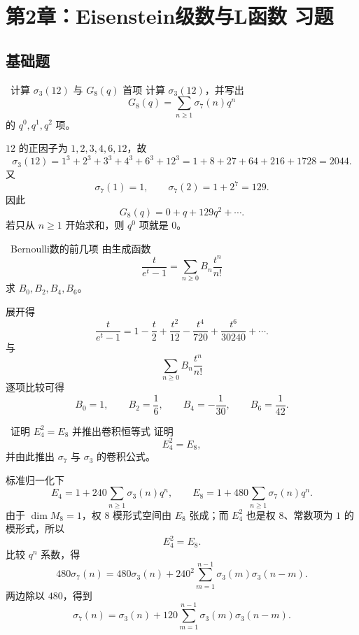 \chapter{第2章：Eisenstein级数与L函数 习题}
\label{ch:ex-ch2}

\difficultykey

\section{基础题 \easy}

\begin{problem}{\easy\ 计算 $\sigma_3(12)$ 与 $G_8(q)$ 首项}
计算 $\sigma_3(12)$，并写出
\[
G_8(q)=\sum_{n\ge1}\sigma_7(n)q^n
\]
的 $q^0,q^1,q^2$ 项。
\end{problem}
\begin{solution}
$12$ 的正因子为 $1,2,3,4,6,12$，故
\[
\sigma_3(12)=1^3+2^3+3^3+4^3+6^3+12^3=1+8+27+64+216+1728=2044.
\]
又
\[
\sigma_7(1)=1,\qquad \sigma_7(2)=1+2^7=129.
\]
因此
\[
G_8(q)=0+q+129q^2+\cdots.
\]
若只从 $n\ge1$ 开始求和，则 $q^0$ 项就是 $0$。
\end{solution}

\begin{problem}{\easy\ Bernoulli数的前几项}
由生成函数
\[
\frac{t}{e^t-1}=\sum_{n\ge0}B_n\frac{t^n}{n!}
\]
求 $B_0,B_2,B_4,B_6$。
\end{problem}
\begin{solution}
展开得
\[
\frac{t}{e^t-1}=1-\frac t2+\frac{t^2}{12}-\frac{t^4}{720}+\frac{t^6}{30240}+\cdots.
\]
与
\[
\sum_{n\ge0}B_n\frac{t^n}{n!}
\]
逐项比较可得
\[
B_0=1,\qquad B_2=\frac16,\qquad B_4=-\frac1{30},\qquad B_6=\frac1{42}.
\]
\end{solution}

\begin{problem}{\easy\ 证明 $E_4^2=E_8$ 并推出卷积恒等式}
证明
\[
E_4^2=E_8,
\]
并由此推出 $\sigma_7$ 与 $\sigma_3$ 的卷积公式。
\end{problem}
\begin{solution}
标准归一化下
\[
E_4=1+240\sum_{n\ge1}\sigma_3(n)q^n,\qquad
E_8=1+480\sum_{n\ge1}\sigma_7(n)q^n.
\]
由于 $\dim M_8=1$，权 $8$ 模形式空间由 $E_8$ 张成；而 $E_4^2$ 也是权 $8$、常数项为 $1$ 的模形式，所以
\[
E_4^2=E_8.
\]
比较 $q^n$ 系数，得
\[
480\sigma_7(n)=480\sigma_3(n)+240^2\sum_{m=1}^{n-1}\sigma_3(m)\sigma_3(n-m).
\]
两边除以 $480$，得到
\[
\sigma_7(n)=\sigma_3(n)+120\sum_{m=1}^{n-1}\sigma_3(m)\sigma_3(n-m).
\]
\end{solution}

